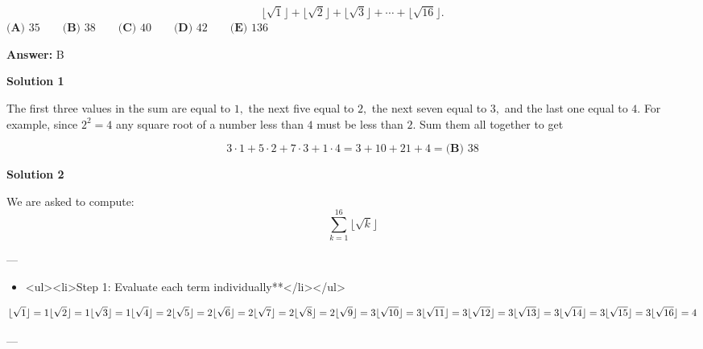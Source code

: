 \begin{enumerate}
 \[\lfloor \sqrt{1} \rfloor + \lfloor \sqrt{2} \rfloor + \lfloor \sqrt{3} \rfloor + \cdots + \lfloor \sqrt{16} \rfloor.\]
$\textbf{(A) } 35 \qquad\textbf{(B) } 38 \qquad\textbf{(C) } 40 \qquad\textbf{(D) } 42 \qquad\textbf{(E) } 136$

 \textbf{Answer: }B



\textbf{Solution 1}

The first three values in the sum are equal to $1,$ the next five equal to $2,$ the next seven equal to $3,$ and the last one equal to $4.$ For example, since $2^2=4$ any square root of a number less than $4$ must be less than $2.$ Sum them all together to get

 
 \[3\cdot1 + 5\cdot2 + 7\cdot3 + 1\cdot4 = 3+10+21+4 = \boxed{\textbf{(B) \ } 38}\]




\textbf{Solution 2}

We are asked to compute: 
 \[\sum_{k=1}^{16} \lfloor \sqrt{k} \rfloor\]

 ---

 
            \begin{itemize}
        \item <ul><li>Step 1: Evaluate each term individually**</li></ul>
            \end{itemize}
            
 \[\lfloor \sqrt{1} \rfloor = 1 \\ \lfloor \sqrt{2} \rfloor = 1 \\ \lfloor \sqrt{3} \rfloor = 1 \\ \lfloor \sqrt{4} \rfloor = 2 \\ \lfloor \sqrt{5} \rfloor = 2 \\ \lfloor \sqrt{6} \rfloor = 2 \\ \lfloor \sqrt{7} \rfloor = 2 \\ \lfloor \sqrt{8} \rfloor = 2 \\ \lfloor \sqrt{9} \rfloor = 3 \\ \lfloor \sqrt{10} \rfloor = 3 \\ \lfloor \sqrt{11} \rfloor = 3 \\ \lfloor \sqrt{12} \rfloor = 3 \\ \lfloor \sqrt{13} \rfloor = 3 \\ \lfloor \sqrt{14} \rfloor = 3 \\ \lfloor \sqrt{15} \rfloor = 3 \\ \lfloor \sqrt{16} \rfloor = 4\]

 ---


\end{enumerate}
